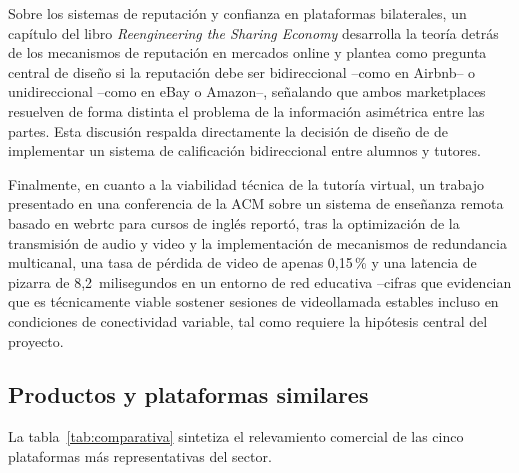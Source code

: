 Sobre los sistemas de reputación y confianza en plataformas bilaterales,
un capítulo del libro \emph{Reengineering the Sharing Economy}
\citep{reputation} desarrolla la teoría detrás de los mecanismos de
reputación en mercados online y plantea como pregunta central de diseño
si la reputación debe ser bidireccional --como en Airbnb-- o
unidireccional --como en eBay o Amazon--, señalando que ambos
marketplaces resuelven de forma distinta el problema de la información
asimétrica entre las partes. Esta discusión respalda directamente la
decisión de diseño de \sistema{} de implementar un sistema de
calificación bidireccional entre alumnos y tutores.

Finalmente, en cuanto a la viabilidad técnica de la tutoría virtual, un
trabajo presentado en una conferencia de la ACM \citep{webrtc2025} sobre
un sistema de enseñanza remota basado en \gls{webrtc} para cursos de
inglés reportó, tras la optimización de la transmisión de audio y video
y la implementación de mecanismos de redundancia multicanal, una tasa de
pérdida de video de apenas 0,15\,\% y una latencia de pizarra de
8,2~milisegundos en un entorno de red educativa --cifras que evidencian
que es técnicamente viable sostener sesiones de videollamada estables
incluso en condiciones de conectividad variable, tal como requiere la
hipótesis central del proyecto.

\subsection{Productos y plataformas similares}

La tabla~\ref{tab:comparativa} sintetiza el relevamiento comercial de
las cinco plataformas más representativas del sector.

